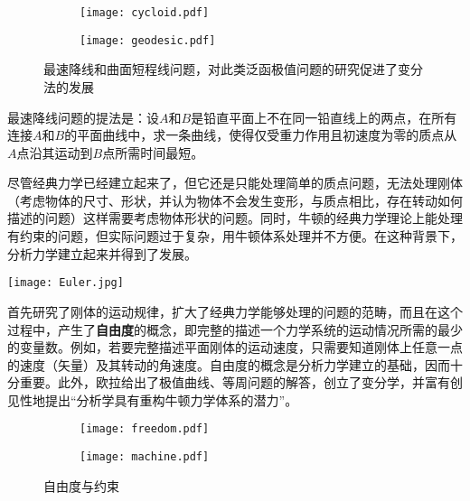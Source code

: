 \begin{figure}[ht]
    \centering
    \begin{subfigure}[t]{0.4\textwidth} \centering
        \texttt{[image: cycloid.pdf]}
    \end{subfigure}\quad
    \begin{subfigure}[t]{0.4\textwidth} \centering
        \texttt{[image: geodesic.pdf]}
    \end{subfigure}
    \caption{最速降线和曲面短程线问题，对此类泛函极值问题的研究促进了变分法的发展}
\end{figure}
\begin{marginpartext}
    最速降线问题的提法是：设$A$和$B$是铅直平面上不在同一铅直线上的两点，在所有连接$A$和$B$的平面曲线中，求一条曲线，使得仅受重力作用且初速度为零的质点从$A$点沿其运动到$B$点所需时间最短。
\end{marginpartext}

尽管经典力学已经建立起来了，但它还是只能处理简单的质点问题，无法处理刚体（考虑物体的尺寸、形状，并认为物体不会发生变形，与质点相比，存在转动如何描述的问题）这样需要考虑物体形状的问题。同时，牛顿的经典力学理论上能处理有约束的问题，但实际问题过于复杂，用牛顿体系处理并不方便。在这种背景下，分析力学建立起来并得到了发展。

\begin{marginparfigure}
    \texttt{[image: Euler.jpg]}
\end{marginparfigure}

首先研究了刚体的运动规律，扩大了经典力学能够处理的问题的范畴，而且在这个过程中，产生了\textbf{自由度}的概念，即完整的描述一个力学系统的运动情况所需的最少的变量数。例如，若要完整描述平面刚体的运动速度，只需要知道刚体上任意一点的速度（矢量）及其转动的角速度。自由度的概念是分析力学建立的基础，因而十分重要。此外，欧拉给出了极值曲线、等周问题的解答，创立了变分学，并富有创见性地提出“分析学具有重构牛顿力学体系的潜力”。

\begin{figure}[ht]
    \centering
    \begin{subfigure}[t]{0.4\textwidth} \centering
        \texttt{[image: freedom.pdf]}
    \end{subfigure}\quad
    \begin{subfigure}[t]{0.4\textwidth} \centering
        \texttt{[image: machine.pdf]}
    \end{subfigure}
    \caption{自由度与约束}
\end{figure}

